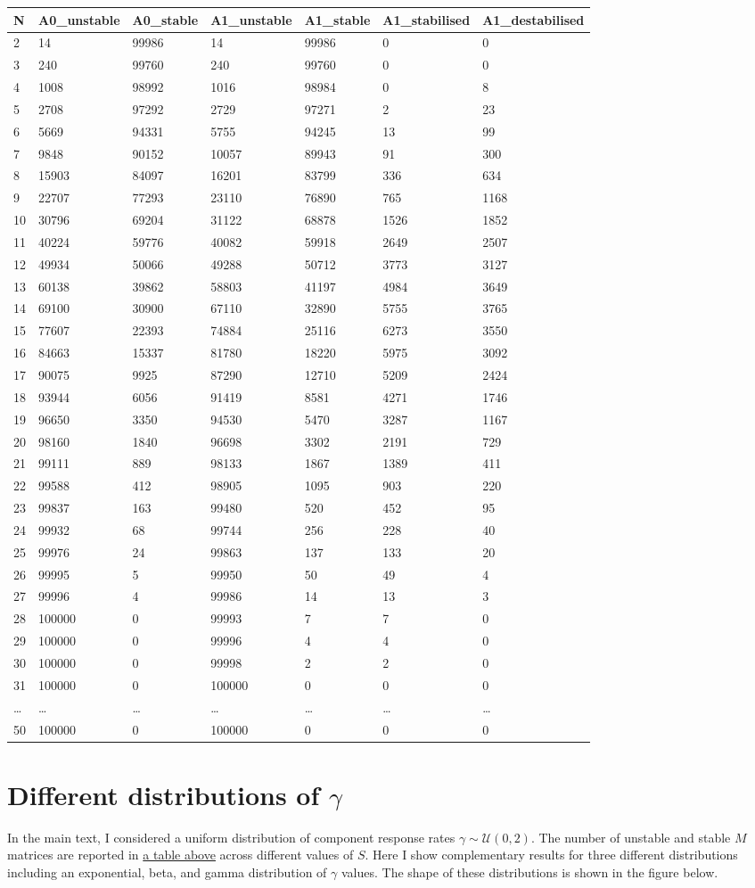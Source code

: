 \documentclass[]{article}
\begin{document}
\begin{longtable}[]{@{}lllllll@{}}
\toprule
N & A0\_unstable & A0\_stable & A1\_unstable & A1\_stable &
A1\_stabilised & A1\_destabilised\tabularnewline
\midrule
\endhead
2 & 14 & 99986 & 14 & 99986 & 0 & 0\tabularnewline
3 & 240 & 99760 & 240 & 99760 & 0 & 0\tabularnewline
4 & 1008 & 98992 & 1016 & 98984 & 0 & 8\tabularnewline
5 & 2708 & 97292 & 2729 & 97271 & 2 & 23\tabularnewline
6 & 5669 & 94331 & 5755 & 94245 & 13 & 99\tabularnewline
7 & 9848 & 90152 & 10057 & 89943 & 91 & 300\tabularnewline
8 & 15903 & 84097 & 16201 & 83799 & 336 & 634\tabularnewline
9 & 22707 & 77293 & 23110 & 76890 & 765 & 1168\tabularnewline
10 & 30796 & 69204 & 31122 & 68878 & 1526 & 1852\tabularnewline
11 & 40224 & 59776 & 40082 & 59918 & 2649 & 2507\tabularnewline
12 & 49934 & 50066 & 49288 & 50712 & 3773 & 3127\tabularnewline
13 & 60138 & 39862 & 58803 & 41197 & 4984 & 3649\tabularnewline
14 & 69100 & 30900 & 67110 & 32890 & 5755 & 3765\tabularnewline
15 & 77607 & 22393 & 74884 & 25116 & 6273 & 3550\tabularnewline
16 & 84663 & 15337 & 81780 & 18220 & 5975 & 3092\tabularnewline
17 & 90075 & 9925 & 87290 & 12710 & 5209 & 2424\tabularnewline
18 & 93944 & 6056 & 91419 & 8581 & 4271 & 1746\tabularnewline
19 & 96650 & 3350 & 94530 & 5470 & 3287 & 1167\tabularnewline
20 & 98160 & 1840 & 96698 & 3302 & 2191 & 729\tabularnewline
21 & 99111 & 889 & 98133 & 1867 & 1389 & 411\tabularnewline
22 & 99588 & 412 & 98905 & 1095 & 903 & 220\tabularnewline
23 & 99837 & 163 & 99480 & 520 & 452 & 95\tabularnewline
24 & 99932 & 68 & 99744 & 256 & 228 & 40\tabularnewline
25 & 99976 & 24 & 99863 & 137 & 133 & 20\tabularnewline
26 & 99995 & 5 & 99950 & 50 & 49 & 4\tabularnewline
27 & 99996 & 4 & 99986 & 14 & 13 & 3\tabularnewline
28 & 100000 & 0 & 99993 & 7 & 7 & 0\tabularnewline
29 & 100000 & 0 & 99996 & 4 & 4 & 0\tabularnewline
30 & 100000 & 0 & 99998 & 2 & 2 & 0\tabularnewline
31 & 100000 & 0 & 100000 & 0 & 0 & 0\tabularnewline
\ldots{} & \ldots{} & \ldots{} & \ldots{} & \ldots{} & \ldots{} &
\ldots{}\tabularnewline
50 & 100000 & 0 & 100000 & 0 & 0 & 0\tabularnewline
\bottomrule
\end{longtable}

\hypertarget{gam_dist}{\section{\texorpdfstring{Different distributions
of
\(\gamma\)}{Different distributions of \textbackslash{}gamma}}\label{gam_dist}}

In the main text, I considered a uniform distribution of component
response rates \(\gamma \sim \mathcal{U}(0, 2)\). The number of unstable
and stable \(M\) matrices are reported in \protect\hyperlink{IncrS}{a
table above} across different values of \(S\). Here I show complementary
results for three different distributions including an exponential,
beta, and gamma distribution of \(\gamma\) values. The shape of these
distributions is shown in the figure below.
\end{document}
